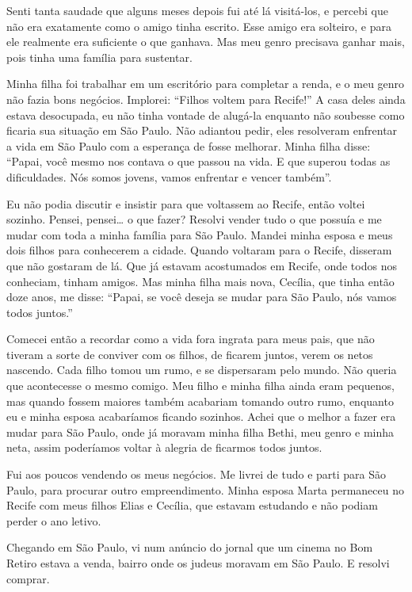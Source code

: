 Senti tanta saudade que alguns meses depois fui até lá visitá-los, e
percebi que não era exatamente como o amigo tinha escrito. Esse amigo era solteiro, e para ele realmente era suficiente o que ganhava. Mas meu genro precisava ganhar mais, pois tinha uma família para sustentar.

Minha filha foi trabalhar em um escritório para completar a renda, e o
meu genro não fazia bons negócios. Implorei: ``Filhos voltem para
Recife!'' A casa deles ainda estava desocupada, eu não tinha vontade de
alugá-la enquanto não soubesse como ficaria sua situação em São
Paulo. Não adiantou pedir, eles resolveram enfrentar a vida em São
Paulo com a esperança de fosse melhorar. Minha filha disse:
``Papai, você mesmo nos contava o que passou na vida. E que superou
todas as dificuldades. Nós somos jovens, vamos enfrentar e
vencer também''.

Eu não podia discutir e insistir para que voltassem ao Recife, então 
voltei sozinho. Pensei, pensei\ldots{} o que fazer? Resolvi vender tudo o que
possuía e me mudar com toda a minha família para São Paulo. Mandei minha
esposa e meus dois filhos para conhecerem a cidade. Quando 
voltaram para o Recife, disseram que não gostaram de lá. 
Que já estavam acostumados em Recife, onde todos nos conheciam,
tinham amigos. Mas minha filha mais nova, Cecília, que tinha então doze
anos, me disse: ``Papai, se você deseja se mudar para São Paulo, nós
vamos todos juntos.''

Comecei então a recordar como a vida fora ingrata para meus pais, que não
tiveram a sorte de conviver com os filhos, de ficarem juntos, verem os
netos nascendo. Cada filho tomou um rumo, e se dispersaram
pelo mundo. Não queria que acontecesse o mesmo comigo. Meu filho e
minha filha ainda eram pequenos, mas quando fossem maiores também
acabariam tomando outro rumo, enquanto eu e minha esposa acabaríamos ficando sozinhos.
Achei que o melhor a fazer era mudar para São Paulo, onde já
moravam minha filha Bethi, meu genro e minha neta, assim poderíamos voltar à alegria de ficarmos todos juntos.

Fui aos poucos vendendo os meus negócios. Me livrei de tudo e parti para São
Paulo, para procurar outro empreendimento. Minha esposa Marta
permaneceu no Recife com meus filhos Elias e Cecília, que estavam
estudando e não podiam perder o ano letivo.

Chegando em São Paulo, vi num anúncio do jornal que um cinema no Bom 
Retiro estava a venda, bairro onde os judeus moravam em São Paulo. E 
resolvi comprar.

